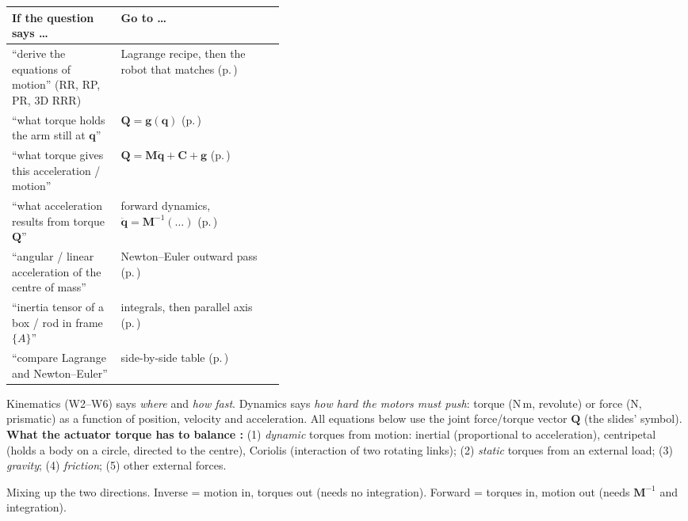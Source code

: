 \begin{multicols}{2}

\small
\begin{tabularx}{\linewidth}{@{}>{\raggedright\arraybackslash}p{0.40\linewidth}>{\raggedright\arraybackslash}X@{}}
\toprule If the question says \dots & Go to \dots\\\midrule
``derive the equations of motion'' (RR, RP, PR, 3D RRR) & Lagrange recipe, then the robot that matches (p.\,\pageref{w7:lagrecipe})\\
``what torque holds the arm still at $\mathbf q$'' & $\mathbf Q=\mathbf g(\mathbf q)$ (p.\,\pageref{w7:scenarios})\\
``what torque gives this acceleration / motion'' & $\mathbf Q=\mathbf M\ddot{\mathbf q}+\mathbf C+\mathbf g$ (p.\,\pageref{w7:scenarios})\\
``what acceleration results from torque $\mathbf Q$'' & forward dynamics, $\ddot{\mathbf q}=\mathbf M^{-1}(\dots)$ (p.\,\pageref{w7:scenarios})\\
``angular / linear acceleration of the centre of mass'' & Newton--Euler outward pass (p.\,\pageref{w7:nepass})\\
``inertia tensor of a box / rod in frame $\{A\}$'' & integrals, then parallel axis (p.\,\pageref{w7:inertia})\\
``compare Lagrange and Newton--Euler'' & side-by-side table (p.\,\pageref{w7:twoway})\\
\bottomrule
\end{tabularx}
\normalsize

Kinematics (W2--W6) says \emph{where} and \emph{how fast}. Dynamics says \emph{how hard the motors must push}: torque (N\,m, revolute) or force (N, prismatic) as a function of position, velocity and acceleration. All equations below use the joint force/torque vector $\mathbf Q$ (the slides' symbol).
\textbf{What the actuator torque has to balance :} (1) \emph{dynamic} torques from motion: inertial (proportional to acceleration), centripetal (holds a body on a circle, directed to the centre), Coriolis (interaction of two rotating links); (2) \emph{static} torques from an external load; (3) \emph{gravity}; (4) \emph{friction}; (5) other external forces.
\begin{trap}
Mixing up the two directions. Inverse = motion in, torques out (needs no integration). Forward = torques in, motion out (needs $\mathbf M^{-1}$ and integration).
\end{trap}


\end{multicols}
